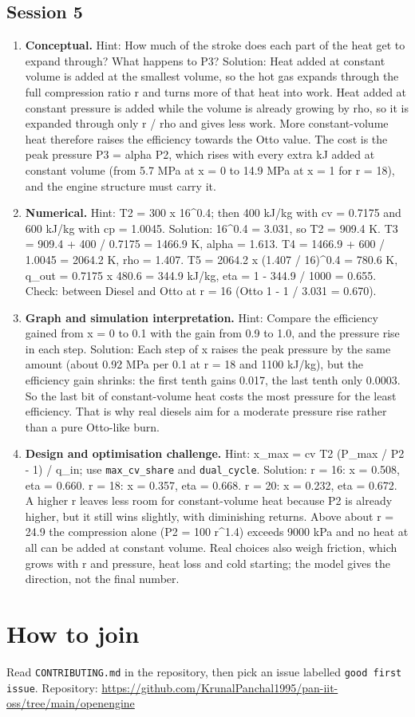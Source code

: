 \documentclass[11pt,a4paper]{article}
\begin{document}
\subsection*{Session 5}
\begin{enumerate}[nosep]
\item \textbf{Conceptual.} Hint: How much of the stroke does each part of the heat get to expand through? What happens to P3? Solution: Heat added at constant volume is added at the smallest volume, so the hot gas expands through the full compression ratio r and turns more of that heat into work. Heat added at constant pressure is added while the volume is already growing by rho, so it is expanded through only r / rho and gives less work. More constant-volume heat therefore raises the efficiency towards the Otto value. The cost is the peak pressure P3 = alpha P2, which rises with every extra kJ added at constant volume (from 5.7 MPa at x = 0 to 14.9 MPa at x = 1 for r = 18), and the engine structure must carry it.
\item \textbf{Numerical.} Hint: T2 = 300 x 16\textasciicircum{}0.4; then 400 kJ/kg with cv = 0.7175 and 600 kJ/kg with cp = 1.0045. Solution: 16\textasciicircum{}0.4 = 3.031, so T2 = 909.4 K. T3 = 909.4 + 400 / 0.7175 = 1466.9 K, alpha = 1.613. T4 = 1466.9 + 600 / 1.0045 = 2064.2 K, rho = 1.407. T5 = 2064.2 x (1.407 / 16)\textasciicircum{}0.4 = 780.6 K, q\_out = 0.7175 x 480.6 = 344.9 kJ/kg, eta = 1 - 344.9 / 1000 = 0.655. Check: between Diesel and Otto at r = 16 (Otto 1 - 1 / 3.031 = 0.670).
\item \textbf{Graph and simulation interpretation.} Hint: Compare the efficiency gained from x = 0 to 0.1 with the gain from 0.9 to 1.0, and the pressure rise in each step. Solution: Each step of x raises the peak pressure by the same amount (about 0.92 MPa per 0.1 at r = 18 and 1100 kJ/kg), but the efficiency gain shrinks: the first tenth gains 0.017, the last tenth only 0.0003. So the last bit of constant-volume heat costs the most pressure for the least efficiency. That is why real diesels aim for a moderate pressure rise rather than a pure Otto-like burn.
\item \textbf{Design and optimisation challenge.} Hint: x\_max = cv T2 (P\_max / P2 - 1) / q\_in; use \texttt{max\_cv\_share} and \texttt{dual\_cycle}. Solution: r = 16: x = 0.508, eta = 0.660. r = 18: x = 0.357, eta = 0.668. r = 20: x = 0.232, eta = 0.672. A higher r leaves less room for constant-volume heat because P2 is already higher, but it still wins slightly, with diminishing returns. Above about r = 24.9 the compression alone (P2 = 100 r\textasciicircum{}1.4) exceeds 9000 kPa and no heat at all can be added at constant volume. Real choices also weigh friction, which grows with r and pressure, heat loss and cold starting; the model gives the direction, not the final number.
\end{enumerate}
\section{How to join}
Read \texttt{CONTRIBUTING.md} in the repository, then pick an issue labelled \texttt{good first issue}. Repository: \url{https://github.com/KrunalPanchal1995/pan-iit-oss/tree/main/openengine}
\end{document}
